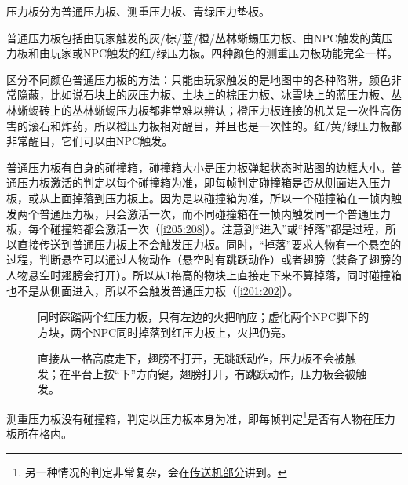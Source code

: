压力板分为普通压力板、测重压力板、青绿压力垫板。

普通压力板包括由玩家触发的灰/棕/蓝/橙/丛林蜥蜴压力板、由NPC触发的黄压力板和由玩家或NPC触发的红/绿压力板。四种颜色的测重压力板功能完全一样。

\begin{remark*}{}{}
  区分不同颜色普通压力板的方法：只能由玩家触发的是地图中的各种陷阱，颜色非常隐蔽，比如说石块上的灰压力板、土块上的棕压力板、冰雪块上的蓝压力板、丛林蜥蜴砖上的丛林蜥蜴压力板都非常难以辨认；橙压力板连接的机关是一次性高伤害的滚石和炸药，所以橙压力板相对醒目，并且也是一次性的。红/黄/绿压力板都非常醒目，它们可以由NPC触发。
\end{remark*}

普通压力板有自身的碰撞箱，碰撞箱大小是压力板弹起状态时贴图的边框大小。普通压力板激活的判定以每个碰撞箱为准，即每帧判定碰撞箱是否从侧面进入压力板，或从上面掉落到压力板上。因为是以碰撞箱为准，所以一个碰撞箱在一帧内触发两个普通压力板，只会激活一次，而不同碰撞箱在一帧内触发同一个普通压力板，每个碰撞箱都会激活一次（\autoref{i205:208}）。注意到“进入”或“掉落”都是过程，所以直接传送到普通压力板上不会触发压力板。同时，“掉落”要求人物有一个悬空的过程，判断悬空可以通过人物动作（悬空时有跳跃动作）或者翅膀（装备了翅膀的人物悬空时翅膀会打开）。所以从1格高的物块上直接走下来不算掉落，同时碰撞箱也不是从侧面进入，所以不会触发普通压力板（\autoref{i201:202}）。

\begin{figure}[!ht]
  \centering
  \qquad
  \caption{\protect{}同时踩踏两个红压力板，只有左边的火把响应；\protect{}虚化两个NPC脚下的方块，两个NPC同时掉落到红压力板上，火把仍亮。}
  \label{i205:208}
\end{figure}

\begin{figure}[!ht]
  \centering
  \qquad
  \caption{\protect{}直接从一格高度走下，翅膀不打开，无跳跃动作，压力板不会被触发；\protect{}在平台上按“下”方向键，翅膀打开，有跳跃动作，压力板会被触发。}
  \label{i201:202}
\end{figure}

测重压力板没有碰撞箱，判定以压力板本身为准，即每帧判定\footnote{另一种情况的判定非常复杂，会在\hyperref[sec9]{传送机部分}讲到。}是否有人物在压力板所在格内。

